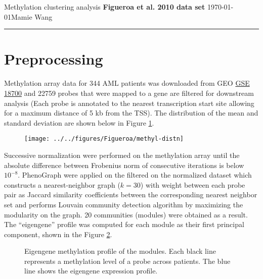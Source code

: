 \documentclass{article}
\begin{document}
\noindent
Methylation clustering analysis \hfill \textbf{Figueroa et al. 2010 data set} \newline 
\today \hfill Mamie Wang

\noindent
\rule{\linewidth}{0.4pt}

\listoffigures

\clearpage

\section{Preprocessing}

Methylation array data for 344 AML patients was downloaded from GEO \href{https://www.ncbi.nlm.nih.gov/geo/query/acc.cgi?acc=GSE18700}{GSE 18700} and 22759 probes that were mapped to a gene are filtered for downstream analysis (Each probe is annotated to the nearest transcription start site allowing for a maximum distance of 5 kb from the TSS). The distribution of the mean and standard deviation are shown below in Figure \ref{methylDistn}. 

\begin{figure}[htbp]
\begin{center}
\texttt{[image: ../../figures/Figueroa/methyl-distn]}
\caption[Mean and standard deviation of the raw methylation data]{}
\label{methylDistn}
\end{center}
\end{figure}

Successive normalization were performed on the methylation array \cite{olshen2010successive} until the absolute difference between Frobenius norm of consecutive iterations is below $10^{-8}$. PhenoGraph were applied on the filtered on the normalized dataset \cite{levine2015data} which constructs a nearest-neighbor graph ($k = 30$) with weight between each probe pair as Jaccard similarity coefficients between the corresponding nearest neighbor set and performs Louvain community detection algorithm by maximizing the modularity on the graph. 20 communities (modules) were obtained as a result. The ``eigengene'' profile was computed for each module as their first principal component, shown in the Figure \ref{eigenGene}. 

\begin{figure}[htbp]
\begin{center}

\caption[Eigengene methylation profile of the modules]{Eigengene methylation profile of the modules. Each black line represents a methylation level of a probe across patients. The blue line shows the eigengene expression profile.}
\label{eigenGene}
\end{center}
\end{figure}




\clearpage

\appendix

\clearpage
\end{document}
